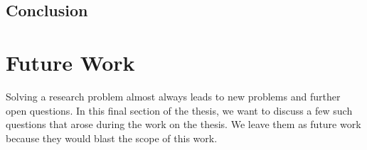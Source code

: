 \documentclass[paper=a4,%
  twoside,%
  BCOR4mm,%
  abstract=true,%
  toc=bibliography,%
  chapterprefix=true,%
  toc=bibliographynumbered,%
  open=right,%
  english,%
  pagesize=pdftex]{scrreprt}
\begin{document}

\section{Conclusion}
\label{sec:discussion}

\clearpage
\chapter{Future Work}
\label{chap:future-work}
Solving a research problem almost always leads to new problems and further open questions. In this final section of the thesis, we want to discuss a few such questions that arose during the work on the thesis. We leave them as future work because they would blast the scope of this work. 
\end{document}
